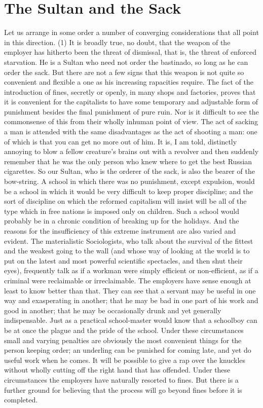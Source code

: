 \documentclass{book}
\begin{document}
\section{The Sultan and the Sack}
Let us arrange in some order a number of converging considerations that all point in this direction. (1) It is broadly true, no doubt, that the weapon of the employer has hitherto been the threat of dismissal, that is, the threat of enforced starvation. He is a Sultan who need not order the bastinado, so long as he can order the sack. But there are not a few signs that this weapon is not quite so convenient and flexible a one as his increasing rapacities require. The fact of the introduction of fines, secretly or openly, in many shops and factories, proves that it is convenient for the capitalists to have some temporary and adjustable form of punishment besides the final punishment of pure ruin. Nor is it difficult to see the commonsense of this from their wholly inhuman point of view. The act of sacking a man is attended with the same disadvantages as the act of shooting a man: one of which is that you can get no more out of him. It is, I am told, distinctly annoying to blow a fellow creature’s brains out with a revolver and then suddenly remember that he was the only person who knew where to get the best Russian cigarettes. So our Sultan, who is the orderer of the sack, is also the bearer of the bow-string. A school in which there was no punishment, except expulsion, would be a school in which it would be very difficult to keep proper discipline; and the sort of discipline on which the reformed capitalism will insist will be all of the type which in free nations is imposed only on children. Such a school would probably be in a chronic condition of breaking up for the holidays. And the reasons for the insufficiency of this extreme instrument are also varied and evident. The materialistic Sociologists, who talk about the survival of the fittest and the weakest going to the wall (and whose way of looking at the world is to put on the latest and most powerful scientific spectacles, and then shut their eyes), frequently talk as if a workman were simply efficient or non-efficient, as if a criminal were reclaimable or irreclaimable. The employers have sense enough at least to know better than that. They can see that a servant may be useful in one way and exasperating in another; that he may be bad in one part of his work and good in another; that he may be occasionally drunk and yet generally indispensable. Just as a practical school-master would know that a schoolboy can be at once the plague and the pride of the school. Under these circumstances small and varying penalties are obviously the most convenient things for the person keeping order; an underling can be punished for coming late, and yet do useful work when he comes. It will be possible to give a rap over the knuckles without wholly cutting off the right hand that has offended. Under these circumstances the employers have naturally resorted to fines. But there is a further ground for believing that the process will go beyond fines before it is completed.
\end{document}
